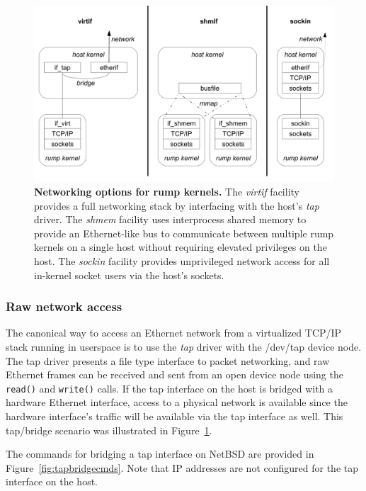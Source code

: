 \begin{figure}[t]
\includegraphics[width=\linewidth]{ifcomp}
\caption[Networking options for rump kernels]{
\textbf{Networking options for rump kernels.}
The \textit{virtif}
facility provides a full networking stack by interfacing with the host's
\textit{tap} driver.  The \textit{shmem} facility uses interprocess
shared memory to provide an Ethernet-like bus to communicate between
multiple rump kernels on a single host without requiring elevated
privileges on the host.
The \textit{sockin} facility provides unprivileged network access for
all in-kernel socket users via the host's sockets.
}
\label{fig:netcomp}
\end{figure}

\subsubsection*{Raw network access}

The canonical way to access an Ethernet network from a virtualized
TCP/IP stack running in userspace is to use the \textit{tap} driver
with the {/dev/tap} device node.  The tap driver presents a file type
interface to packet networking, and raw Ethernet frames can be
received and sent from an open device node using the \texttt{read()} and
\texttt{write()} calls.  If the tap interface on the host is bridged with
a hardware Ethernet interface, access to a physical network is available
since the hardware interface's traffic will be available via the tap
interface as well.  This tap/bridge scenario was illustrated in
Figure~\ref{fig:netcomp}.

The commands for bridging a tap interface on NetBSD are
provided in Figure~\ref{fig:tapbridgecmds}.  Note that IP addresses
are not configured for the tap interface on the host.

